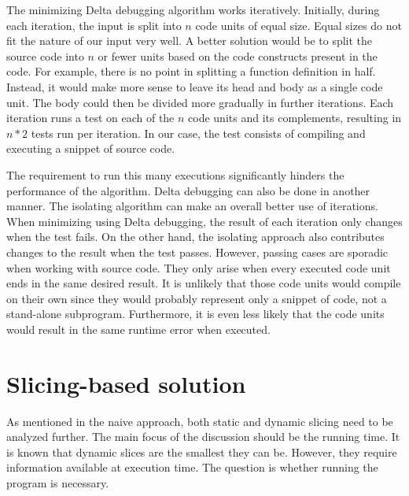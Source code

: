 
The minimizing Delta debugging algorithm works iteratively.
Initially, during each iteration, the input is split into $n$ code units 
of equal size.
Equal sizes do not fit the nature of our input very well.
A better solution would be to split the source code into $n$ or fewer units 
based on the code constructs present in the code.
For example, there is no point in splitting a function definition in half.
Instead, it would make more sense to leave its head and body as a single 
code unit.
The body could then be divided more gradually in further iterations.
Each iteration runs a test on each of the $n$ code units and its 
complements, resulting in $n * 2$ tests run per iteration.
In our case, the test consists of compiling and executing a snippet of 
source code.

The requirement to run this many executions significantly hinders 
the performance of the algorithm.
Delta debugging can also be done in another manner.
The isolating algorithm can make an overall better use of iterations.
When minimizing using Delta debugging, the result of each iteration 
only changes when the test fails.
On the other hand, the isolating approach also contributes changes 
to the result when the test passes.
However, passing cases are sporadic when working with source code.
They only arise when every executed code unit ends in the same desired 
result.
It is unlikely that those code units would compile on their own since 
they would probably represent only a snippet of code, not a stand-alone 
subprogram.
Furthermore, it is even less likely that the code units would result 
in the same runtime error when executed.



\section{Slicing-based solution}

As mentioned in the naive approach, both static and dynamic slicing need 
to be analyzed further.
The main focus of the discussion should be the running time.
It is known that dynamic slices are the smallest they can be.
However, they require information available at execution time.
The question is whether running the program is necessary.

